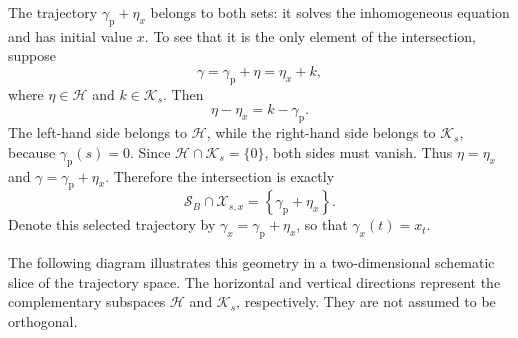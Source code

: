 \documentclass[12pt,a4paper,oneside]{book}
\begin{document}
\begin{example}
\begin{solution}
The trajectory $\gamma_{\mathrm p}+\eta_x$ belongs to both sets: it solves the inhomogeneous equation and has initial value $x$. To
see that it is the only element of the intersection, suppose
\begin{equation*}
    \gamma=\gamma_{\mathrm p}+\eta=\eta_x+k,
\end{equation*}
where $\eta\in\mathcal H$ and $k\in\mathcal K_s$. Then
\begin{equation*}
    \eta-\eta_x=k-\gamma_{\mathrm p}.
\end{equation*}
The left-hand side belongs to $\mathcal H$, while the right-hand side belongs to $\mathcal K_s$, because $\gamma_{\mathrm p}(s)=0$.
Since $\mathcal H\cap\mathcal K_s=\{0\}$, both sides must vanish. Thus $\eta=\eta_x$ and $\gamma=\gamma_{\mathrm p}+\eta_x$. Therefore
the intersection is exactly
\begin{equation*}
    \mathcal S_{B}\cap\mathcal X_{s,x} =
    \left\{
        \gamma_{\mathrm p}+\eta_x
    \right\}.
\end{equation*}
Denote this selected trajectory by $\gamma_x=\gamma_{\mathrm p}+\eta_x$, so that $\gamma_x(t)=x_t$.

The following diagram illustrates this geometry in a two-dimensional schematic slice of the trajectory space. The horizontal
and vertical directions represent the complementary subspaces $\mathcal H$ and $\mathcal K_s$, respectively. They are not
assumed to be orthogonal.
\begin{center}
\end{center}
\end{solution}
\end{example}
\end{document}
